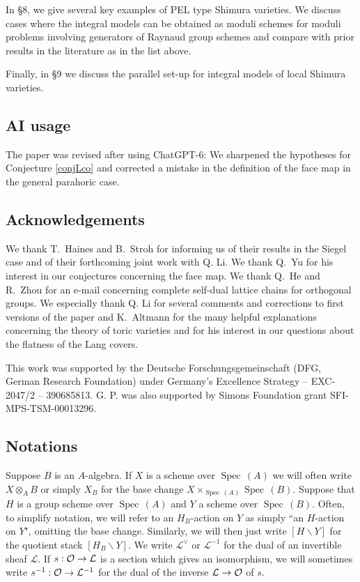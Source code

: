 \documentclass[reqno, 10pt]{amsart}
\makeatletter
\newcommand{\CL}{\ensuremath{\mathcal {L}}\xspace}
\newcommand{\CO}{\ensuremath{\mathcal {O}}\xspace}
\DeclareMathOperator{\Spec}{Spec\,}
\newcommand{\bs}{\backslash}
\theoremstyle{definition}
\numberwithin{equation}{subsection}
\numberwithin{subsubsection}{subsection}
\renewcommand{\to}{%
   \ifbool{@display}{\longrightarrow}{\rightarrow}%
   }
\makeatother
\begin{document}
In \S 8, we give several key examples of PEL type Shimura varieties. We discuss cases where the integral models can be obtained as moduli schemes for moduli problems involving generators of Raynaud group schemes and compare with prior results in the literature as in the list above. 

Finally, in \S 9 we discuss the parallel set-up for integral models of  local Shimura varieties.

 \subsection{AI usage} The paper was revised after using ChatGPT-6: We sharpened the hypotheses for Conjecture \ref{conjLco} and corrected a mistake in the definition of the face map in the general parahoric case.

 
\subsection{Acknowledgements} We thank T.~Haines and B.~Stroh for informing us of their results in the Siegel case and of their forthcoming joint work with Q. Li.   We thank Q.~Yu for his interest in our conjectures concerning the face map. We thank Q.~He and R.~Zhou for an e-mail concerning complete self-dual lattice chains for orthogonal groups. We especially thank Q. Li for several comments and corrections to  first versions of the paper and K.~Altmann for the many helpful explanations concerning the theory of toric varieties and for his interest in our questions about the flatness of the Lang covers.

 
 
This work was supported by the Deutsche Forschungsgemeinschaft (DFG, German Research Foundation) under Germany's Excellence Strategy – EXC-2047/2 – 390685813. G. P. was also supported by Simons Foundation grant SFI-MPS-TSM-00013296.

 

\subsection{Notations} Suppose $B$ is an $A$-algebra. If $X$ is a scheme over $\Spec(A)$ we will often write $X\otimes_{ A}B$ or simply $X_B$ for the base change $X\times_{\Spec(A)}\Spec(B)$. Suppose that $H$ is a group scheme over $\Spec(A)$ and $Y$ a scheme over $\Spec(B)$. Often, to simplify notation, we will refer to an $H_B$-action on $Y$  as simply ``an $H$-action on $Y$", omitting the base change.
Similarly, we will then   just write $[H\bs Y]$ for the quotient stack $[H_B\bs Y]$. We write $\CL^\vee$ or $\CL^{-1}$ for the dual of an invertible sheaf $\CL$. If $s: \CO\to \CL$ is a section which gives an isomorphism, we will sometimes write $s^{-1}:\CO\to \CL^{-1}$ for the dual of the inverse $ \CL\to \CO$ of $s$.
\end{document}
